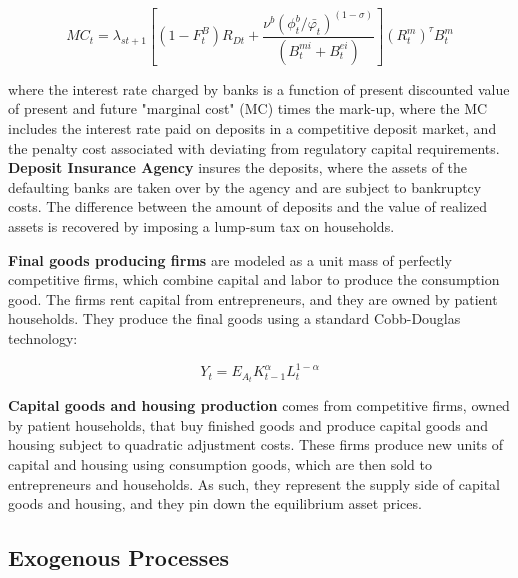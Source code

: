 \documentclass[12pt]{article}
\numberwithin{equation}{section}
\begin{document}
\begin{equation}
MC_t=\lambda_{st+1}[(1-F^B_t)R_{Dt}+\frac{\nu^b(\phi^b_t/{\bar{\varphi_t}})^{(1-\sigma)}}{(B^{mi}_t+B^{ei}_t)}](R^m_t)^\tau B^m_t
\end{equation}

where the interest rate charged by banks is a function of present discounted value of present and future "marginal cost" (MC) times the mark-up, where the MC includes the interest rate paid on deposits in a competitive deposit market, and the penalty cost associated with deviating from regulatory capital requirements.  
\textbf{Deposit Insurance Agency} insures the deposits, where the assets of the defaulting banks are taken over by the agency and are subject to bankruptcy costs. The difference between the amount of deposits and the value of realized assets is recovered by imposing a lump-sum tax on households. 

\textbf{Final goods producing firms} are modeled as a unit mass of perfectly competitive firms, which combine capital and labor to produce the consumption good. The firms rent capital from entrepreneurs, and they are owned by patient households. They produce the final goods using a standard Cobb-Douglas technology: 

\begin{equation}
Y_{t}=E_{A_{t}} K^{\alpha}_{t-1}L^{1-\alpha}_{t}
\end{equation}

\textbf{Capital goods and housing production } comes from competitive firms, owned by patient households,  that buy finished goods and produce capital goods and housing subject to quadratic adjustment costs. These firms produce new units of capital and housing using consumption goods, which are then sold to entrepreneurs and households. As such, they represent the supply side of capital goods and housing, and they pin down the equilibrium asset prices. 

\subsection{Exogenous Processes}
\end{document}
